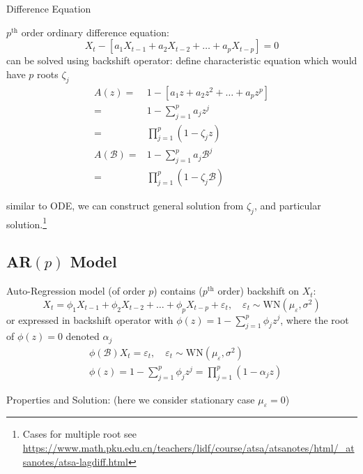 \begin{point}
    Difference Equation
\end{point}

    $ p^\mathrm{th}  $ order ordinary difference equation:
    \begin{equation}
        X_t-\left[a_1X_{t-1}+a_2X_{t-2}+\ldots+a_pX_{t-p}\right]=0 
    \end{equation}
    can be solved using backshift operator: define characteristic equation which would have $ p $ roots $ \zeta _j $
    \begin{align}
        A(z)=&1-\left[a_1z+a_2z^2+\ldots+a_pz^p\right]\\
        =&1-\sum_{j=1}^pa_jz^j\\
        =&\prod_{j=1}^p(1-\zeta _jz)\\
        A(\mathscr{B} )=&1-\sum_{j=1}^pa_j\mathscr{B} ^j\\
        =&\prod_{j=1}^p(1-\zeta _j\mathscr{B} )
    \end{align}
    
    similar to ODE, we can construct general solution from $ \zeta _j $, and particular solution.\footnote{Cases for multiple root see \url{https://www.math.pku.edu.cn/teachers/lidf/course/atsa/atsanotes/html/_atsanotes/atsa-lagdiff.html}}

\subsection{AR$ (p) $ Model}
    Auto-Regression model (of order $ p $) contains ($ p^\mathrm{th} $ order) backshift on $ X_t $:
    \begin{equation}
        X_t=\phi _1X_{t-1}+\phi _2X_{t-2}+\ldots+\phi _pX_{t-p}+\varepsilon _t,\quad \varepsilon _t\sim \mathrm{WN}(\mu_\varepsilon  ,\sigma ^2)  
    \end{equation}
    or expressed in backshift operator with $ \phi (z)=1-\sum_{j=1}^p\phi _jz^j $, where the root of $ \phi (z)=0 $ denoted $ \alpha _j $
    \begin{align}
        &\phi (\mathscr{B} )X_t=\varepsilon _t,\quad\varepsilon _t\sim \mathrm{WN}(\mu_\varepsilon  ,\sigma ^2)   \\
        &\phi (z)=1-\sum_{j=1}^p\phi _jz^j=\prod_{j=1}^p(1-\alpha _jz)
    \end{align}

\begin{point}
    Properties and Solution: (here we consider stationary case $ \mu_\varepsilon  =0 $)
\end{point}

